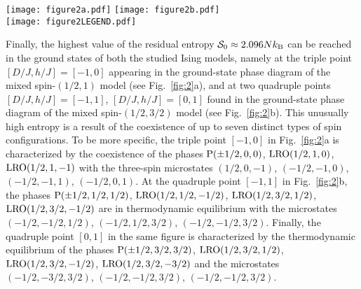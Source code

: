 \documentclass[final,5p,times,sort&compress]{elsarticle}
\begin{document}
\begin{figure*}[t!]
\vspace{0.1cm}
\centering
  \texttt{[image: figure2a.pdf]}%
  \texttt{[image: figure2b.pdf]}\\
  \texttt{[image: figure2LEGEND.pdf]}
\vspace{-0.25cm}
\caption{(Color online) Ground-state phase diagrams in the $D-h$ plane for the mixed spin-$(1/2,1)$ model (figure~a) and for the mixed spin-$(1/2,3/2)$ model (figure~b). The individual phases are distinguished by the spin states of distinct sublattices listed in rounded brackets in order $(A, B, C)$ or $(A, C, B)$ depending on whether the condition $J_{AB} = -J_{AC} = J>0$ or $-J_{AB} = J_{AC} = J>0$ is valid, respectively. Legend states the values of zero-temperature residual entropy at individual phase boundaries and higher-order coexistence points.}
\label{fig:2}
\end{figure*}
Finally, the highest value of the residual entropy ${\cal S}_{0} \approx 2.096Nk_{\rm B}$ can be reached in the ground states of both the studied Ising models, namely at the triple point \linebreak $\left[D/J, h/J\right]=\left[-1, 0\right]$ appearing in the ground-state phase diagram of the mixed spin-$(1/2,1)$ model (see Fig.~\ref{fig:2}a), and at two quadruple points $\left[D/J, h/J\right]=\left[-1, 1\right]$, $\left[D/J, h/J\right]=\left[0, 1\right]$ found in the ground-state phase diagram of the mixed spin-$(1/2,3/2)$ model (see Fig.~\ref{fig:2}b). This unusually high entropy is a result of the coexistence of up to seven distinct types  of spin configurations. To be more specific, the triple point $\left[-1, 0\right]$ in Fig.~\ref{fig:2}a is characterized by the coexistence of the phases ${\rm P}(\pm1/2, 0,0)$, ${\rm LRO}(1/2, 1,0)$, ${\rm LRO}(1/2, 1,-1)$  with the three-spin microstates $(1/2, 0,-1)$, $(-1/2, -1,0)$, $(-1/2, -1, 1)$, \linebreak $(-1/2, 0, 1)$. At the quadruple point $\left[-1, 1\right]$ in Fig.~\ref{fig:2}b, the phases ${\rm P}(\pm1/2, 1/2,1/2)$, ${\rm LRO}(1/2, 1/2,-1/2)$, ${\rm LRO}(1/2, 3/2,1/2)$, \linebreak ${\rm LRO}(1/2, 3/2,-1/2)$ are in thermodyna\-mic equilibrium with the microstates $(-1/2, -1/2,1/2)$, $(-1/2, 1/2, 3/2)$, \linebreak $(-1/2, -1/2, 3/2)$. Finally, the quadruple point $\left[0, 1\right]$ in the same figure is characterized by the thermodynamic equilibrium of the phases ${\rm P}(\pm1/2, 3/2,3/2)$, ${\rm LRO}(1/2, 3/2,1/2)$, \linebreak ${\rm LRO}(1/2, 3/2,-1/2)$,  ${\rm LRO}(1/2, 3/2,-3/2)$ and the microstates $(-1/2, -3/2,3/2)$, $(-1/2, -1/2, 3/2)$, $(-1/2, -1/2, 3/2)$.
\end{document}
